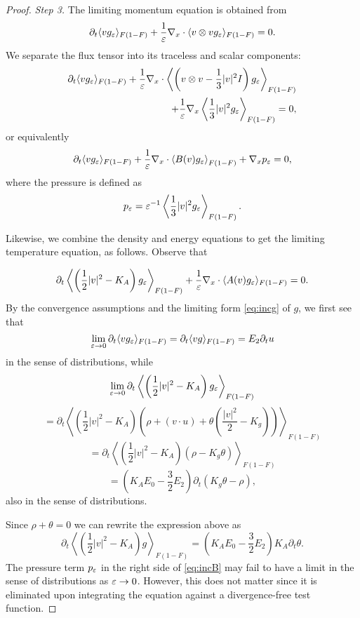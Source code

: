 \begin{proof}
\textit{Step 3.}
The limiting momentum equation is obtained from 
\[\partial_t\langle
vg_{\varepsilon}\rangle_{F(1-F)}+\frac{1}{{\varepsilon}}\nabla_x\cdot\langle
v\otimes vg_{\varepsilon}\rangle_{F(1-F)}= 0.\]
We separate the flux tensor into its traceless and  scalar components:
\[\begin{split}\partial_t\langle vg_{\varepsilon}\rangle_{F(1-F)}
+\frac{1}{{\varepsilon}}\nabla_x\cdot
\left\langle\left( v\otimes v-\frac 13
|v|^2I\right)g_{\varepsilon}\right\rangle_{F(1-F)}
\\+\frac{1}{{\varepsilon}}\nabla_x 
\left\langle \frac 13 |v|^2   g_{\varepsilon}\right\rangle_{F(1-F)} =
0,\end{split}\]
or equivalently
\begin{equation}\partial_t\langle
vg_{\varepsilon}\rangle_{F(1-F)}+\frac{1}{{\varepsilon}}\nabla_x\cdot
\left\langle B(v)g_{\varepsilon}\right\rangle_{F(1-F)}+ \nabla_x p_{\varepsilon}= 0,
\label{eq:incB}
\end{equation}
where the pressure is defined as  \[p_{\varepsilon} = {\varepsilon}^{-1}
\left\langle \frac 13 |v|^2 g_{\varepsilon}\right\rangle_{F(1-F)} .\]

Likewise, we combine the density and energy equations to get the
limiting temperature equation, as follows. Observe that

\begin{equation}\partial_t\left\langle \left(\frac 12 |v|^2-K_A\right)
g_{\varepsilon}\right\rangle_{F(1-F)}+\frac{1}{{\varepsilon}}\nabla_x\cdot\langle
A(v)g_{\varepsilon}\rangle_{F(1-F)}= 0.\label{eq:incA}\end{equation}
By the convergence assumptions and the limiting form \eqref{eq:incg} of $g$, we first see that
\[\lim\limits_{{\varepsilon}\to 0}\partial_t\langle
vg_{\varepsilon}\rangle_{F(1-F)}=\partial_t\langle vg
\rangle_{F(1-F)}=E_2\partial_t u\]
in the sense of distributions, while
\[\lim\limits_{{\varepsilon}\to 0} \partial_t\left\langle \left(\frac 12
|v|^2-K_A\right)g_{\varepsilon}\right\rangle_{F(1-F)}\]
\[=\partial_t\left\langle \left(\frac 12 |v|^2-K_A\right)\left(\rho+(v\cdot
u)+\theta \left(\frac{|v|^2}{2}-K_g\right)  \right)\right\rangle_{F(1-F)}
\]
\[=\partial_t\left\langle \left(\frac 12 |v|^2-K_A\right)\left(\rho- 
K_g\theta\right)\right\rangle_{F(1-F)}\]
\[=\left( K_AE_0 -\frac{3}{2}  E_2 \right)\partial_t(K_g\theta-\rho),\]also in the sense of distributions.

Since $\rho+\theta=0$ we can rewrite the expression above as
\[\partial_t\left\langle \left(\frac 12 |v|^2-K_A\right)
g\right\rangle_{F(1-F)}=\left( K_AE_0 -\frac{3}{2}  E_2 \right)K_A\partial_t \theta.\]
The pressure term $p_{\varepsilon}$ in the right side of \eqref{eq:incB} may fail to have a limit in the sense of distributions as ${\varepsilon}\to 0$. However, this does not matter since it is eliminated upon integrating the equation
 against a divergence-free test function.


\end{proof}
